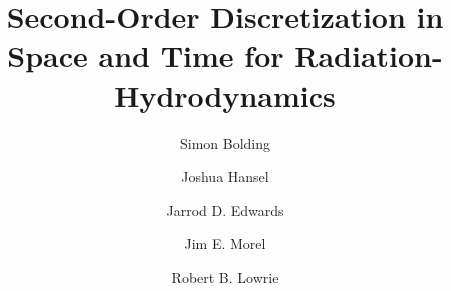 \documentclass[preprint,12pt]{elsarticle}
\begin{document}
\begin{frontmatter}



\title{Second-Order Discretization in Space and Time for Radiation-Hydrodynamics}


\author[tamu_address]{Simon Bolding}
\author[tamu_address]{Joshua Hansel}
\author[sandia_address]{Jarrod D. Edwards}
\author[tamu_address]{Jim E. Morel}
\author[lanl_address]{Robert B. Lowrie}



\end{frontmatter}
\end{document}
